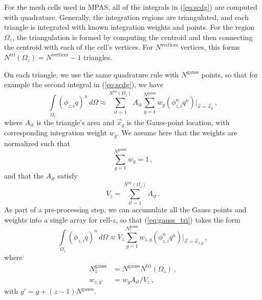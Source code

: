 \documentclass[11pt]{report}
\newcommand{\svec}[1]{{\Vec{#1}}}
\begin{document}
For the mesh cells used in MPAS, all of the integrals in (\ref{eq:scdg}) are
computed with quadrature.  Generally, the integration regions are
triangulated, and each triangle is integrated with known integration weights
and points.  For the region $\Omega_z$, the triangulation is formed by
computing the centroid and then connecting the centroid with each of the
cell's vertices.  For $N^\mathrm{vertices}$ vertices, 
this forms $N^{\mathrm{tri}}(\Omega_z) = N^\mathrm{vertices}-1$ triangles.

On each triangle, we use the same quadrature rule with $N^{\mathrm{gauss}}$
points, so that for example the second integral in (\ref{eq:scdg}), we have
\begin{equation}
  \label{eq:gauss_tri}
  \int\limits_{\Omega_z} (\phi_{z,i} q)^{n} \, d\Omega \approx 
     \sum_{it=1}^{N^{\mathrm{tri}}(\Omega_z)} A_{it}
     \sum_{g=1}^{N^{\mathrm{gauss}}}
       w_{g} (\phi^n_{z,i} q^n)|_{\svec{x}=\svec{x}_{g}}\,,
\end{equation}
where $A_{it}$ is the triangle's area and $\svec{x}_{g}$ is the Gauss-point
location, with corresponding integration weight $w_{g}$.  We assume here
that the weights are normalized such that
\begin{equation}
  \sum_{g=1}^{N^\mathrm{gauss}} w_{g} = 1\,,
\end{equation}
and that the $A_{it}$ satisfy
\begin{equation}
  V_z = \sum_{it=1}^{N^{\mathrm{tri}}(\Omega_z)} A_{it}\,.
\end{equation}
As part of a pre-processing step, we can accumulate all the Gauss points and
weights into a single array for cell-$z$, so that (\ref{eq:gauss_tri}) takes
the form
\begin{equation}
  \label{eq:gauss_vor}
  \int\limits_{\Omega_z} (\phi_{z,i} q)^{n} \, d\Omega \approx 
     V_z \sum_{g=1}^{N^{\mathrm{gauss}}_z}
       w_{z,g} (\phi^n_{z,i} q^n)|_{\svec{x}=\svec{x}_{z,g}}\,,
\end{equation}
where
\begin{align}
  N^{\mathrm{gauss}}_z &= N^{\mathrm{gauss}} N^{\mathrm{tri}}(\Omega_z)\,,\\
  w_{z,g'} &= w_g A_{it} / V_z\,,
\end{align}
with $g'=g+(z-1)N^{\mathrm{gauss}}$.
\end{document}
